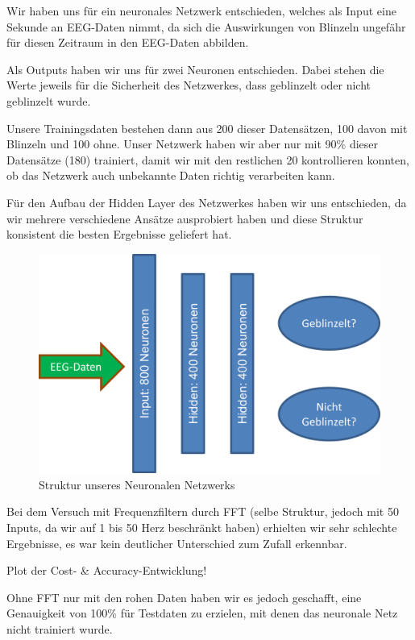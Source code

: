 \documentclass{scrartcl}
\begin{document}
	Wir haben uns für ein neuronales Netzwerk entschieden, welches als Input eine Sekunde an EEG-Daten nimmt, da sich die Auswirkungen von Blinzeln ungefähr für diesen Zeitraum in den EEG-Daten abbilden. 

	Als Outputs haben wir uns für zwei Neuronen entschieden. Dabei stehen die Werte jeweils für die Sicherheit des Netzwerkes, dass geblinzelt oder nicht geblinzelt wurde.

	Unsere Trainingsdaten bestehen dann aus 200 dieser Datensätzen, 100 davon mit Blinzeln und 100 ohne. Unser Netzwerk haben wir aber nur mit 90\% dieser Datensätze (180) trainiert, damit wir mit den restlichen 20 kontrollieren konnten, ob das Netzwerk auch  unbekannte Daten richtig verarbeiten kann.

	Für den Aufbau der Hidden Layer des Netzwerkes haben wir uns entschieden, da wir mehrere verschiedene Ansätze ausprobiert haben und diese Struktur konsistent die besten Ergebnisse geliefert hat.

	\begin{figure}[h]
		\includegraphics[width=\textwidth]{pictures/netzwerk-struktur.png}
		\caption{Struktur unseres Neuronalen Netzwerks}
	\end{figure}

	Bei dem Versuch mit Frequenzfiltern durch FFT (selbe Struktur, jedoch mit 50 Inputs, da wir auf 1 bis 50 Herz beschränkt haben) erhielten wir sehr schlechte Ergebnisse, es war kein deutlicher Unterschied zum Zufall erkennbar.

	Plot der Cost- \& Accuracy-Entwicklung!

	Ohne FFT nur mit den rohen Daten haben wir es jedoch geschafft, eine Genauigkeit von 100\% für Testdaten zu erzielen, mit denen das neuronale Netz nicht trainiert wurde.
\end{document}
